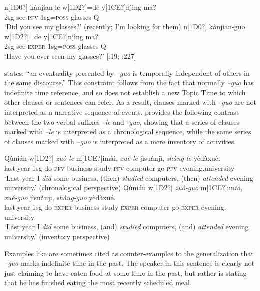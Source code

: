 \ea
\ea  \gll n[1D0?]  kànjian-le  w[1D2?]=de  y[1CE?]njìng  ma?\\
2sg  see-\textsc{pfv}  1sg=\textsc{poss}  glasses  Q\\
\glt ‘Did you see my glasses?’ (recently; I’m looking for them)
\ex \gll  n[1D0?]  kànjian-guo  w[1D2?]=de  y[1CE?]njìng  ma?\\
2sg  see-\textsc{exper}  1sg=\textsc{poss}  glasses  Q\\
\glt ‘Have you ever seen my glasses?’  [\citealt{Ma1977}:19; \citealt{LiThompson1981}:227]
\z \z


\citet{Wu2009} states: “an eventuality presented by \textit{–guo} is temporally independent of others in the same discourse.” This constraint follows from the fact that normally \textit{–guo} has indefinite time reference, and so does not establish a new Topic Time to which other clauses or sentences can refer. As a result, clauses marked with \textit{–guo} are not interpreted as a narrative sequence of events. \citet[308]{Iljic1990} provides the following contrast between the two verbal suffixes \textit{–le} and \textit{-guo}, showing that a series of clauses marked with \textit{–le} is interpreted as a chronological sequence, while the same series of clauses marked with \textit{–guo} is interpreted as a mere inventory of activities.


\ea

\ea \gll  Qùnián  w[1D2?]  \textit{zuò-le}  m[1CE?]imài,  \textit{xué-le}  jìsuànj\={\i},  \textit{shàng-le}  yèdàxué.\\
last.year  1sg  do-\textsc{pfv}  business  study-\textsc{pfv}  computer  go-\textsc{pfv}  evening.university\\
\glt ‘Last year I \textit{did} some business, (then) \textit{studied} computers, (then) \textit{attended} evening university.’ (chronological perspective)
\ex \gll  Qùnián  w[1D2?]  \textit{zuò-guo}  m[1CE?]imài,  \textit{xué-guo}  jìsuànj\={\i},  \textit{shàng-guo}  yèdàxué.\\
last.year  1sg  do-\textsc{exper}  business  study-\textsc{exper}  computer  go-\textsc{exper}  evening.          university\\
\glt ‘Last year I \textit{did} some business, (and) \textit{studied} computers, (and) \textit{attended} evening university.’ (inventory perspective)
\z \z


Examples like  are sometimes cited as counter-examples to the generalization that \textit{–guo} marks indefinite time in the past. The speaker in this sentence is clearly not just claiming to have eaten food at some time in the past, but rather is stating that he has finished eating the most recently scheduled meal.


